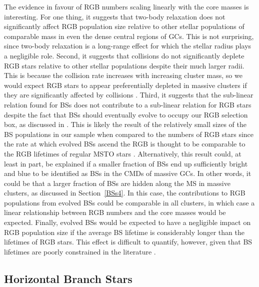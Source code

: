 The evidence in favour of RGB numbers scaling linearly with the core masses 
is interesting.  For one thing, it suggests that two-body relaxation 
does not significantly affect RGB population size relative to other
stellar populations of comparable mass in even the dense central
regions of GCs.  This is not surprising, since two-body 
relaxation is a long-range effect for which the stellar radius plays a
negligible role.   Second, it suggests that collisions do not
significantly deplete RGB stars relative to other stellar populations
despite their much larger radii.  This is because the collision rate
increases with increasing cluster mass, so we would expect RGB stars
to appear preferentially depleted in massive clusters if they are
significantly affected by collisions \citep[e.g.][]{beers04, davies04}.  
Third, it suggests that the sub-linear relation found for BSs does not 
contribute to a sub-linear relation for RGB stars despite the fact that
BSs should eventually evolve to occupy our RGB selection box, as
discussed in \citet{leigh09}.  This is likely the result of the
relatively small sizes of the BS populations in our sample when
compared to the numbers of RGB stars since the rate at which evolved
BSs ascend the RGB is thought to be comparable to the RGB lifetimes of
regular MSTO 
stars \citep{sills09}.  Alternatively, this result could, at least in
part, be explained if
a smaller fraction of BSs end up sufficiently bright and blue to
be identified as BSs in the CMDs of massive GCs.  In other words, it
could be that a larger fraction of BSs are 
hidden along the MS in massive clusters, as discussed in
Section~\ref{BSs4}.  In this case, the
contributions to RGB populations from evolved BSs could be comparable
in all clusters, in which case a linear relationship between RGB
numbers and the core masses would be expected.  Finally, evolved BSs
would be expected to have a negligible impact on RGB population size
if the average BS lifetime is considerably longer than the lifetimes
of RGB stars.  This effect is difficult to quantify, however, given
that BS lifetimes are poorly constrained 
in the literature \citep[e.g.][]{sandquist97, sills01}.

\subsection{Horizontal Branch Stars} \label{HBs4}

